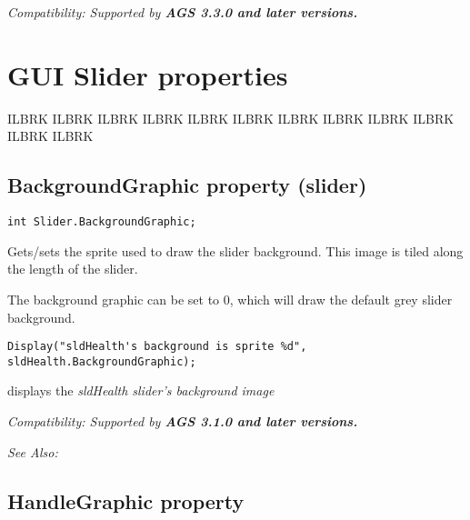 \it{Compatibility:} Supported by \bf{AGS 3.3.0} and later versions.



\section{GUI Slider properties}%

ILBRK
ILBRK
ILBRK
ILBRK
ILBRK
ILBRK
ILBRK
ILBRK
ILBRK
ILBRK
ILBRK
ILBRK


\subsection{BackgroundGraphic property (slider)}\label{Slider.BackgroundGraphic}%

\begin{verbatim}
int Slider.BackgroundGraphic;
\end{verbatim}
Gets/sets the sprite used to draw the slider background. This image is tiled along the length
of the slider.

The background graphic can be set to 0, which will draw the default grey slider background.

\begin{verbatim}
Display("sldHealth's background is sprite %d", sldHealth.BackgroundGraphic);
\end{verbatim}
displays the \it{sldHealth} slider's background image

\it{Compatibility:} Supported by \bf{AGS 3.1.0} and later versions.

\it{See Also:} 


\subsection{HandleGraphic property}\label{Slider.HandleGraphic}%

